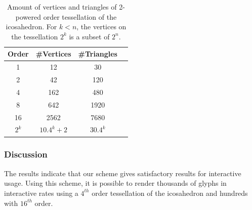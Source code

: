 \documentclass[twoside,twocolumn,10pt]{article}
\begin{document}
\begin{table}[]
\centering
\begin{tabular}{|c|c|c|c|}
\hline
\textbf{Order} & \textbf{\#Vertices} & \textbf{\#Triangles} \\ \hline
1              & 12                 & 30                  \\ \hline
2              & 42                 & 120                 \\ \hline
4              & 162                & 480                 \\ \hline
8              & 642                & 1920                \\ \hline
16             & 2562               & 7680                \\ \hline
$2^k$          & $10.4^k + 2$ & $30.4^k$           \\ \hline
\end{tabular}
\caption{Amount of vertices and triangles of 2-powered order tessellation of the icosahedron. For $k<n$, the vertices on the tessellation $2^k$ is a subset of $2^n$.}
\label{tab::icosahedron_set}
\end{table}

\subsubsection{Discussion}

The results indicate that our scheme gives satisfactory results for interactive usage. Using this scheme, it is possible to render thousands of glyphs in interactive rates using a $4^{th}$ order tessellation of the icosahedron and hundreds with $16^{th}$ order.


\end{document}
